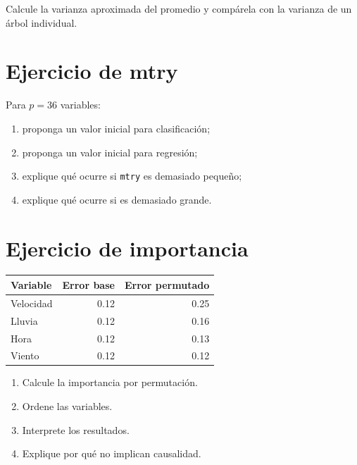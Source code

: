 \documentclass[
  spanish,
  10.5pt,
  letterpaper,
  DIV=11,
  numbers=noendperiod,
  oneside,
  open=any]{scrreprt}
\newcounter{none} %
\providecommand{\tightlist}{%
  \setlength{\itemsep}{0pt}\setlength{\parskip}{0pt}}
\theoremstyle{definition}
\theoremstyle{definition}
\theoremstyle{plain}
\theoremstyle{remark}
\begin{document}
Calcule la varianza aproximada del promedio y compárela con la varianza
de un árbol individual.

\section*{Ejercicio de mtry}\label{ejercicio-de-mtry}


Para \(p=36\) variables:

\begin{enumerate}
\def\labelenumi{\arabic{enumi}.}
\tightlist
\item
  proponga un valor inicial para clasificación;
\item
  proponga un valor inicial para regresión;
\item
  explique qué ocurre si \texttt{mtry} es demasiado pequeño;
\item
  explique qué ocurre si es demasiado grande.
\end{enumerate}

\section*{Ejercicio de importancia}\label{ejercicio-de-importancia}


{\def\LTcaptype{none} %
\begin{longtable}[]{@{}lrr@{}}
\toprule\noalign{}
Variable & Error base & Error permutado \\
\midrule\noalign{}
\endhead
\bottomrule\noalign{}
\endlastfoot
Velocidad & 0.12 & 0.25 \\
Lluvia & 0.12 & 0.16 \\
Hora & 0.12 & 0.13 \\
Viento & 0.12 & 0.12 \\
\end{longtable}
}

\begin{enumerate}
\def\labelenumi{\arabic{enumi}.}
\tightlist
\item
  Calcule la importancia por permutación.
\item
  Ordene las variables.
\item
  Interprete los resultados.
\item
  Explique por qué no implican causalidad.
\end{enumerate}
\end{document}
